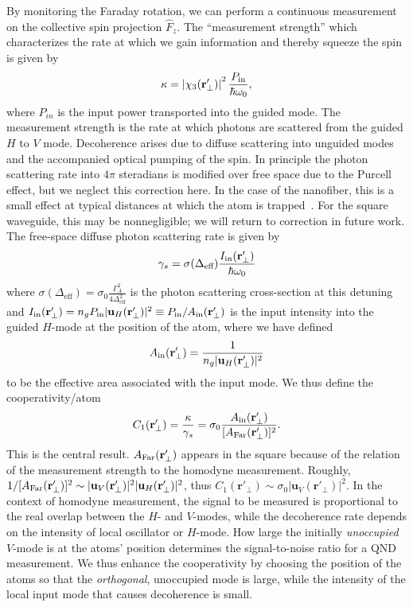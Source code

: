 \documentclass[aps,pra,twocolumn,superscriptaddress]{revtex4-1} %
\newcommand{\mbf}[1]{\mathbf{#1}}
\newcommand{\eff}{\text{eff}}
\newcommand{\AF}{A_{\rm Far}} %
\newcommand{\Ai}{A_{\rm in}} %
\begin{document}
By monitoring the Faraday rotation, we can perform a continuous measurement on the collective spin projection $\hat{F}_z$.  The ``measurement strength'' which characterizes the rate at which we gain information and thereby squeeze the spin is given by
\begin{equation}
\kappa = \left\vert \chi_3(\mbf{r}'_\perp) \right\vert^2 \frac{P_{\rm in}}{\hbar \omega_0},
\end{equation}
where $P_{in}$ is the input power transported into the guided mode.  The measurement strength is the rate at which photons are scattered from the guided $H$ to $V$ mode.  Decoherence arises due to diffuse scattering into unguided modes and the accompanied optical pumping of the spin.  In principle the photon scattering rate into $4\pi$ steradians is modified over free space due to the Purcell effect, but we neglect this correction here.  In the case of the nanofiber, this is a small effect at typical distances at which the atom is trapped~\cite{LeKien2005,Kien2008}.  For the square waveguide, this may be nonnegligible; we will return to correction in future work.  The free-space diffuse photon scattering rate is given by
\begin{equation}
\gamma_s = \sigma(\Delta_{\eff}) \frac{I_{\rm in}(\mbf{r}'_\perp)}{\hbar \omega_0}
\end{equation}
where $\sigma(\Delta_{\eff}) = \sigma_0 \frac{\Gamma_A^2}{4 \Delta^2_{\eff}}$ is the photon scattering cross-section at this detuning and  $I_{\rm in}(\mbf{r}'_\perp) = n_g P_{\rm in}\vert \mbf{u}_H (\mbf{r}'_\perp)  \vert^2 \equiv P_{\rm in}/\Ai(\mbf{r}'_\perp) $ is the input intensity into the guided $H$-mode at the position of the atom, where we have defined
\begin{equation}
\Ai(\mbf{r}'_\perp) =  \frac{1}{n_g \vert \mbf{u}_H (\mbf{r}'_\perp) \vert ^2}
\end{equation}
to be the effective area associated with the input mode.  We thus define the cooperativity/atom
\begin{equation}
C_1 (\mbf{r}'_\perp)  = \frac{\kappa}{\gamma_s} = \sigma_0 \frac{  \Ai(\mbf{r}'_\perp) }{[\AF(\mbf{r}'_\perp)]^2}.
\end{equation}
This is the central result.  $\AF(\mbf{r}'_\perp)$  appears in the square because of the relation of the measurement strength to the homodyne measurement.  Roughly, $1/[\AF(\mbf{r}'_\perp)]^2 \sim \vert \mbf{u}_V (\mbf{r}'_\perp) \vert ^2 \vert \mbf{u}_H (\mbf{r}'_\perp) \vert ^2$, thus $ C_1(\mbf{r}'_\perp) \sim \sigma_0 \vert \mbf{u}_V (\mbf{r}'_\perp) \vert ^2$. In the context of homodyne measurement, the signal to be measured is proportional to the real overlap between the $ H $- and $ V $-modes, while the decoherence rate depends on the intensity of local oscillator or $ H $-mode. How large the initially {\em unoccupied} $ V $-mode is at the atoms' position determines the signal-to-noise ratio for a QND measurement.  We thus enhance the cooperativity by choosing the position of the atoms so that the {\em orthogonal}, unoccupied mode is large, while the intensity of the local input mode that causes decoherence is small.
\end{document}
